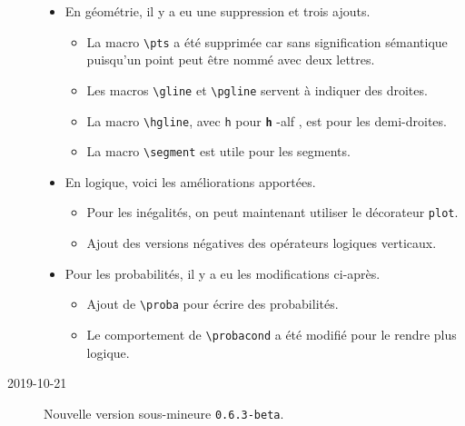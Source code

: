 \documentclass[12pt,a4paper]{article}
\newcommand\env[1]{\texttt{#1}}
\newcommand\macro[1]{\env{\textbackslash{}#1}}
\theoremstyle{definition}
\newcommand\whyprefix[2]{%
	\textbf{\prefix{#1}}-#2%
}
\newcommand\prefix[1]{%
	\texttt{#1}%
}
\begin{document}
\begin{description}
\begin{itemize}[itemsep=.5em]
    
        \item En géométrie, il y a eu une suppression et trois ajouts.
        \begin{itemize}[itemsep=.5em]
            \item La macro \macro{pts} a été supprimée car sans signification sémantique puisqu'un point peut être nommé avec deux lettres.
    
            \item Les macros \macro{gline} et \macro{pgline} servent à indiquer des droites.
    
            \item La macro \macro{hgline}, avec \prefix{h} pour \whyprefix{h}{alf}, est pour les demi-droites.
    
            \item La macro \macro{segment} est utile pour les segments.
        \end{itemize}
    
    
        \item En logique, voici les améliorations apportées.
        \begin{itemize}[itemsep=.5em]
            \item Pour les inégalités, on peut maintenant utiliser le décorateur \verb+plot+.
    
    		\item Ajout des versions négatives des opérateurs logiques verticaux.
        \end{itemize}
    
    
        \item Pour les probabilités, il y a eu les modifications ci-après.
        \begin{itemize}[itemsep=.5em]
            \item Ajout de \macro{proba} pour écrire des probabilités.
    
    		\item Le comportement de \macro{probacond} a été modifié pour le rendre plus logique.
        \end{itemize}
    \end{itemize}


    \medskip
    \item[2019-10-21] Nouvelle version sous-mineure \verb+0.6.3-beta+.
    

\end{description}
\end{document}

